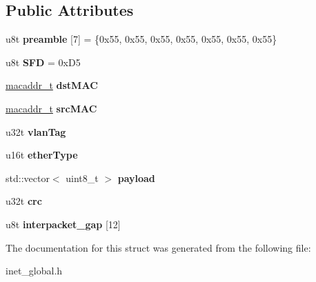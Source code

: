\subsection*{Public Attributes}
\begin{DoxyCompactItemize}
\item 
\mbox{\label{structeth__vlan__frame__t_a78999322e3f11cb4c7e64f63671c9200}} 
u8t {\bfseries preamble} \mbox{[}7\mbox{]} = \{0x55, 0x55, 0x55, 0x55, 0x55, 0x55, 0x55\}
\item 
\mbox{\label{structeth__vlan__frame__t_a69b29b6322d0d6d73939bff432538d06}} 
u8t {\bfseries S\+FD} = 0x\+D5
\item 
\mbox{\label{structeth__vlan__frame__t_af65384a13f1fbccc547ffcd5bd1914c1}} 
\mbox{\hyperlink{structmacaddr__t}{macaddr\+\_\+t}} {\bfseries dst\+M\+AC}
\item 
\mbox{\label{structeth__vlan__frame__t_ae08beab62fa2486d9e06746fc62d5ae0}} 
\mbox{\hyperlink{structmacaddr__t}{macaddr\+\_\+t}} {\bfseries src\+M\+AC}
\item 
\mbox{\label{structeth__vlan__frame__t_a2170006324fff8cb5f96172a340ef852}} 
u32t {\bfseries vlan\+Tag}
\item 
\mbox{\label{structeth__vlan__frame__t_ab1a9bcb061996b0a8a384c89ae7477dc}} 
u16t {\bfseries ether\+Type}
\item 
\mbox{\label{structeth__vlan__frame__t_a3724d5d625e71ba2008fa1d058b1be76}} 
std\+::vector$<$ uint8\+\_\+t $>$ {\bfseries payload}
\item 
\mbox{\label{structeth__vlan__frame__t_a99ce30cc2b1b0c61306f056e71aa497d}} 
u32t {\bfseries crc}
\item 
\mbox{\label{structeth__vlan__frame__t_aa68bb1e435d49b46770315990b3e2021}} 
u8t {\bfseries interpacket\+\_\+gap} \mbox{[}12\mbox{]}
\end{DoxyCompactItemize}


The documentation for this struct was generated from the following file\+:\begin{DoxyCompactItemize}
\item 
inet\+\_\+global.\+h\end{DoxyCompactItemize}
